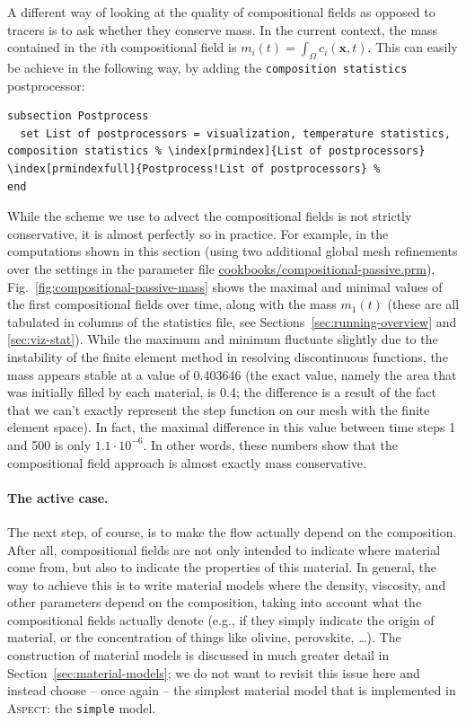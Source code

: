 \documentclass{article}
\newcommand{\aspect}{\textsc{Aspect}}
\begin{document}
A different way of looking at the quality of compositional fields as opposed to
tracers is to ask whether they conserve mass. In the current context, the
mass contained in the $i$th compositional field is $m_i(t)=\int_\Omega c_i(\mathbf x,t)$.
This can easily be achieve in the following way, by adding the \texttt{composition statistics}
postprocessor:
\begin{lstlisting}[frame=single,language=prmfile,escapechar=\%]
subsection Postprocess
  set List of postprocessors = visualization, temperature statistics, composition statistics % \index[prmindex]{List of postprocessors} \index[prmindexfull]{Postprocess!List of postprocessors} %
end
\end{lstlisting}
While the scheme we use to advect the compositional fields is not strictly
conservative, it is almost perfectly so in practice. For example, in
the computations shown in this section (using two additional global mesh
refinements over the settings in the parameter file
\url{cookbooks/compositional-passive.prm}), Fig.~\ref{fig:compositional-passive-mass}
shows the maximal and minimal values of the first compositional fields over time,
along with the mass $m_1(t)$ (these are all tabulated in columns of the
statistics file, see Sections~\ref{sec:running-overview} and \ref{sec:viz-stat}). While
the maximum and minimum fluctuate slightly due to the instability of the finite element
method in resolving discontinuous functions,
the mass appears stable at a value of 0.403646 (the exact value, namely the
area that was initially filled by each material, is 0.4; the difference is a
result of the fact that we can't exactly represent the step function on our
mesh with the finite element space). In fact, the maximal difference in this
value between time steps 1 and 500 is only $1.1\cdot 10^{-6}$. In other words,
these numbers show that the compositional field approach is almost exactly mass conservative.


\paragraph{The active case.} The next step, of course, is to make the flow
actually depend on the composition. After all, compositional fields are not only
intended to indicate where material come from, but also to indicate the
properties of this material. In general, the way to achieve this is to write
material models where the density, viscosity, and other parameters depend on the
composition, taking into account what the compositional fields actually denote
(e.g., if they simply indicate the origin of material, or the concentration of
things like olivine, perovskite, \ldots). The construction of material models is
discussed in much greater detail in Section~\ref{sec:material-models}; we do not
want to revisit this issue here and instead choose -- once again -- the simplest
material model that is implemented in \aspect{}: the \texttt{simple} model.
\end{document}

